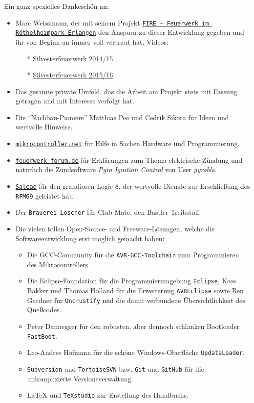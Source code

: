 \documentclass[paper=a4, parskip, numbers=noenddot, toc=listof, headsepline]{scrbook}
\newcommand{\pic}{\emph{Pyro Ignition Control}}
\begin{document}
		Ein ganz spezielles Dankeschön an:
		\begin{itemize}
			\item Marc Weissmann, der mit seinem Projekt \href{http://www.facebook.com/FIREErlangen}{\texttt{FIRE~-- Feuerwerk im Röthelheimpark Erlangen}} den Ansporn zu dieser Entwicklung gegeben und ihr von Beginn an immer voll vertraut hat. Videos:
			      \begin{itemize}
			      	\item[*] \underline{\href{https://vimeo.com/116115628}{Silvesterfeuerwerk 2014/15}}
			      	\item[*] \underline{\href{https://vimeo.com/150594996}{Silvesterfeuerwerk 2015/16}}
			      \end{itemize}
			\item Das gesamte private Umfeld, das die Arbeit am Projekt stets mit Fassung getragen und mit Interesse verfolgt hat.
			\item Die \enquote{Nachbau-Pioniere} Matthias Pee und Cedrik Sikora für Ideen und wertvolle Hinweise.
			\item \href{http://www.mikrocontroller.net}{\texttt{mikrocontroller.net}} für Hilfe in Sachen Hardware und Programmierung.
			\item \href{http://www.feuerwerk-forum.de}{\texttt{feuerwerk-forum.de}} für Erklärungen zum Thema elektrische Zündung und natürlich die Zündsoftware {\pic} von User \emph{pyrobla}.
			\item \href{http://www.saleae.com}{\texttt{Saleae}} für den grandiosen Logic 8, der wertvolle Dienste zur Erschließung des \texttt{RFM69} geleistet hat.
			\item Der \texttt{Brauerei Loscher} für Club Mate, den Bastler-Treibstoff.
			\item Die vielen tollen Open-Source- und Freeware-Lösungen, welche die Softwareentwicklung erst möglich gemacht haben:
			      \begin{itemize}
			      	\item Die GCC-Community für die \texttt{AVR-GCC-Toolchain} zum Programmieren des Mikrocontrollers.
			      	\item Die Eclipse-Foundation für die Programmierumgebung \texttt{Eclipse}, Kees Bakker und Thomas Holland für die Erweiterung \texttt{AVREclipse} sowie Ben Gardner für \texttt{Uncrustify} und die damit verbundene Übersichtlichkeit des Quellcodes.
			      	\item Peter Dannegger für den robusten, aber dennoch schlanken Bootloader \texttt{FastBoot}.
			      	\item Leo-Andres Hofmann für die schöne Windows-Oberfläche \texttt{UpdateLoader}.
			      	\item \texttt{Subversion} und \texttt{TortoiseSVN} bzw. \texttt{Git} und \texttt{GitHub} für die unkomplizierte Versionsverwaltung.
			      	\item {\LaTeX} und \texttt{TeXstudio} zur Erstellung des Handbuchs.
			      \end{itemize}
		\end{itemize}
\end{document}
